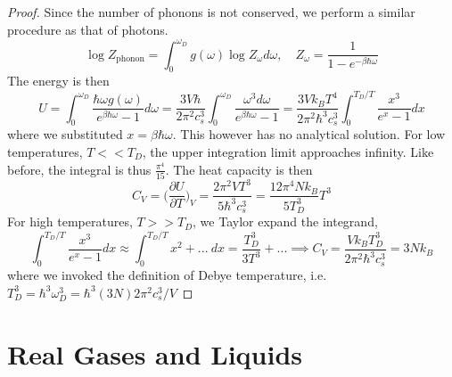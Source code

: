 \documentclass[a4paper]{article}
\theoremstyle{new}
\begin{document}
\begin{proof}
Since the number of phonons is not conserved, we perform a similar procedure as that of photons.
$$\log Z_{\text{phonon}}=\int_0^{\omega_D}g(\omega)\log Z_\omega d\omega,\quad Z_\omega=\frac{1}{1-e^{-\beta\hbar\omega}}$$
The energy is then
$$U=\int_0^{\omega_D}\frac{\hbar\omega g(\omega)}{e^{\beta\hbar\omega}-1}d\omega=\frac{3V\hbar}{2\pi^2c_s^3}\int_0^{\omega_D}\frac{\omega^3d\omega}{e^{\beta\hbar\omega}-1}=\frac{3Vk_BT^4}{2\pi^2\hbar^3c_s^3}\int_0^{T_D/T}\frac{x^3}{e^x-1}dx$$
where we substituted $x=\beta\hbar\omega$. This however has no analytical solution. For low temperatures, $T<<T_D$, the upper integration limit approaches infinity. Like before, the integral is thus $\frac{\pi^4}{15}$. The heat capacity is then
$$C_V=\bigg(\frac{\partial U}{\partial T}\bigg)_V=\frac{2\pi^2VT^3}{5\hbar^3c_s^3}=\frac{12\pi^4Nk_B}{5T_D^3}T^3$$
For high temperatures, $T>>T_D$, we Taylor expand the integrand,
$$\int_0^{T_D/T}\frac{x^3}{e^x-1}dx\approx\int_0^{T_D/T}x^2+...~dx=\frac{T_D^3}{3T^3}+...\implies C_V=\frac{Vk_BT_D^3}{2\pi^2\hbar^3c_s^3}=3Nk_B$$
where we invoked the definition of Debye temperature, i.e. $T_D^3=\hbar^3\omega_D^3=\hbar^3(3N)2\pi^2c_s^3/V$
\end{proof}
\newpage
\section{Real Gases and Liquids}
\end{document}
